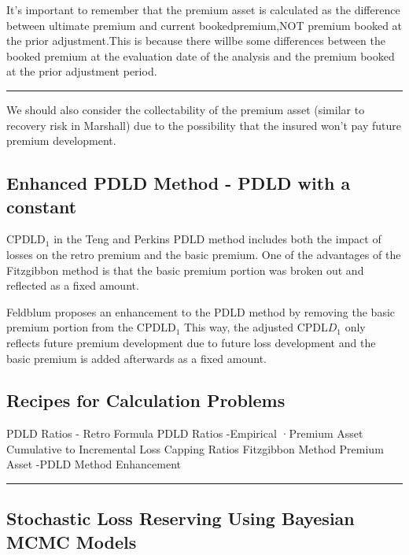 \documentclass[
]{article}
\begin{document}
It's important to remember that the premium asset is calculated as the
difference between ultimate premium and current bookedpremium,NOT
premium booked at the prior adjustment.This is because there willbe some
differences between the booked premium at the evaluation date of the
analysis and the premium booked at the prior adjustment period.

\begin{center}\rule{0.5\linewidth}{0.5pt}\end{center}

We should also consider the collectability of the premium asset (similar
to recovery risk in Marshall) due to the possibility that the insured
won't pay future premium development.

\subsection{Enhanced PDLD Method - PDLD with a
constant}\label{enhanced-pdld-method---pdld-with-a-constant}

\(\mathrm{CPDLD}_{1}\) in the Teng and Perkins PDLD method includes both
the impact of losses on the retro premium and the basic premium. One of
the advantages of the Fitzgibbon method is that the basic premium
portion was broken out and reflected as a fixed amount.

Feldblum proposes an enhancement to the PDLD method by removing the
basic premium portion from the \(\mathrm{CPDLD}_{1}\) This way, the
adjusted CPDL\(D_{1}\) only reflects future premium development due to
future loss development and the basic premium is added afterwards as a
fixed amount.

\subsection{Recipes for Calculation
Problems}\label{recipes-for-calculation-problems-9}

PDLD Ratios - Retro Formula PDLD Ratios -Empirical ·Premium Asset
Cumulative to Incremental Loss Capping Ratios Fitzgibbon Method Premium
Asset -PDLD Method Enhancement

\begin{center}\rule{0.5\linewidth}{0.5pt}\end{center}

\subsection{Stochastic Loss Reserving Using Bayesian MCMC
Models}\label{stochastic-loss-reserving-using-bayesian-mcmc-models}
\end{document}
